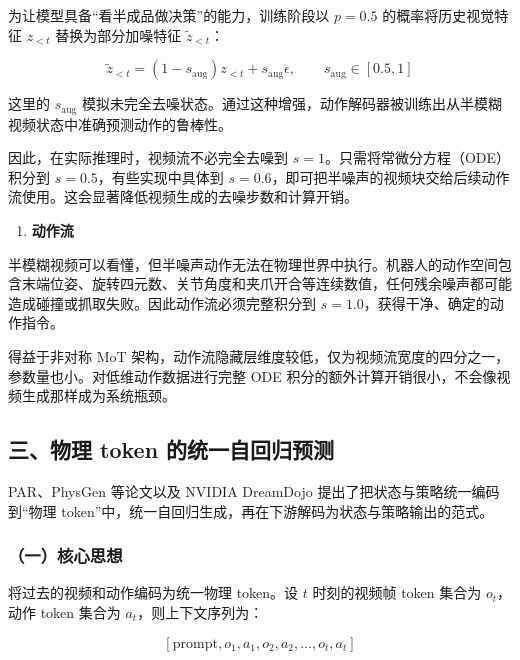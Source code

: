 为让模型具备``看半成品做决策''的能力，训练阶段以 \(p=0.5\) 的概率将历史视觉特征 \(z_{\lt t}\) 替换为部分加噪特征 \(\tilde{z}_{\lt t}\)：

\[
\tilde{z}_{\lt t} = (1-s_{\mathrm{aug}})z_{\lt t} + s_{\mathrm{aug}}\epsilon,
\qquad s_{\mathrm{aug}} \in [0.5, 1]
\]

这里的 \(s_{\mathrm{aug}}\) 模拟未完全去噪状态。通过这种增强，动作解码器被训练出从半模糊视频状态中准确预测动作的鲁棒性。

因此，在实际推理时，视频流不必完全去噪到 \(s=1\)。只需将常微分方程（ODE）积分到 \(s=0.5\)，有些实现中具体到 \(s=0.6\)，即可把半噪声的视频块交给后续动作流使用。这会显著降低视频生成的去噪步数和计算开销。

\begin{enumerate}
\def\labelenumi{\arabic{enumi}.}
\setcounter{enumi}{1}
\tightlist
\item
  \textbf{动作流}
\end{enumerate}

半模糊视频可以看懂，但半噪声动作无法在物理世界中执行。机器人的动作空间包含末端位姿、旋转四元数、关节角度和夹爪开合等连续数值，任何残余噪声都可能造成碰撞或抓取失败。因此动作流必须完整积分到 \(s=1.0\)，获得干净、确定的动作指令。

得益于非对称 MoT 架构，动作流隐藏层维度较低，仅为视频流宽度的四分之一，参数量也小。对低维动作数据进行完整 ODE 积分的额外计算开销很小，不会像视频生成那样成为系统瓶颈。

\hypertarget{ux4e09ux7269ux7406-token-ux7684ux7edfux4e00ux81eaux56deux5f52ux9884ux6d4b}{%
\subsection{三、物理 token 的统一自回归预测}\label{ux4e09ux7269ux7406-token-ux7684ux7edfux4e00ux81eaux56deux5f52ux9884ux6d4b}}

PAR、PhysGen 等论文以及 NVIDIA DreamDojo 提出了把状态与策略统一编码到``物理 token''中，统一自回归生成，再在下游解码为状态与策略输出的范式。

\hypertarget{ux4e00ux6838ux5fc3ux601dux60f3-28}{%
\subsubsection{（一）核心思想}\label{ux4e00ux6838ux5fc3ux601dux60f3-28}}

将过去的视频和动作编码为统一物理 token。设 \(t\) 时刻的视频帧 token 集合为 \(o_t\)，动作 token 集合为 \(a_t\)，则上下文序列为：

\[
\left[\mathrm{prompt}, o_1, a_1, o_2, a_2, \ldots, o_t, a_t\right]
\]

